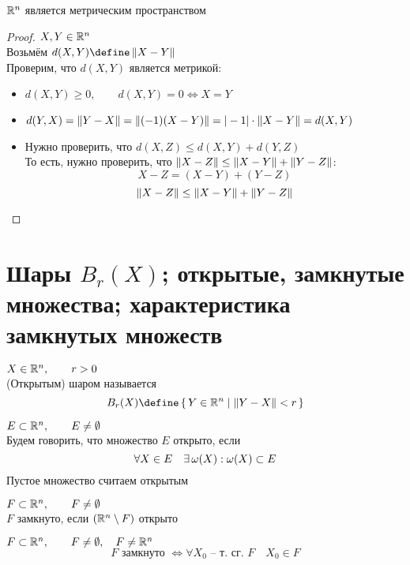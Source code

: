 \begin{statement}
	$ \mathbb{R}^n $ является метрическим пространством
\end{statement}

\begin{proof}
	$ X, Y \in \mathbb{R}^n $ \\
    Возьмём $ d(X, Y) \define \norm{X - Y} $ \\
    Проверим, что $ d(X, Y) $ является метрикой:
    \begin{itemize}
    	\item $ d(X, Y) \ge 0, \qquad d(X, Y) = 0 \iff X = Y $
        \item $ d(Y, X) = \left\|{Y - X}\right\| = \left\|{(-1)(X - Y)}\right\| = |-1| \cdot \left\|{X - Y}\right\| = d(X, Y) $
        \item Нужно проверить, что $ d(X, Z) \le d(X, Y) + d(Y, Z) $ \\
        То есть, нужно проверить, что $ \left\|{X - Z}\right\| \le \left\|{X - Y}\right\| + \left\|{Y - Z}\right\| $:
        $$ X - Z = (X - Y) + (Y - Z) $$
        $$ \left\|{X - Z}\right\| \le \left\|{X - Y}\right\| + \left\|{Y - Z}\right\| $$
    \end{itemize}
\end{proof}

\section{Шары \texorpdfstring{$ B_r(X) $}{}; открытые, замкнутые множества; характеристика замкнутых множеств}

\begin{definition}
	$ X \in \mathbb{R}^n, \qquad r > 0 $ \\
    (Открытым) шаром называется
    $$ B_r(X) \define \set{Y \in \R^n | \norm{Y - X} < r} $$
\end{definition}

\begin{definition}
	$ E \subset \mathbb{R}^n, \qquad E \ne \emptyset $ \\
    Будем говорить, что множество $ E $ открыто, если
    $$ \forall X \in E \quad \exists\, \omega(X) : \omega(X) \subset E $$
    Пустое множество считаем открытым
\end{definition}

\begin{definition}
	$ F \subset \mathbb{R}^n, \qquad F \ne \emptyset $ \\
    $ F $ замкнуто, если $ (\mathbb{R}^n \setminus F) $ открыто
\end{definition}

\begin{theorem}
	$ F \subset \mathbb{R}^n, \qquad F \ne \emptyset, \quad F \ne \mathbb{R}^n $
    $$ F \text{ замкнуто } \iff \forall X_0 \text{ -- т. сг. } F \quad X_0 \in F $$
\end{theorem}

